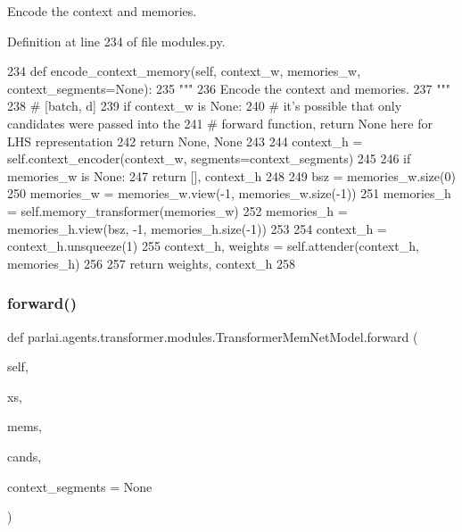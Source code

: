 \begin{DoxyVerb}Encode the context and memories.
\end{DoxyVerb}
 

Definition at line 234 of file modules.\+py.


\begin{DoxyCode}
234     \textcolor{keyword}{def }encode\_context\_memory(self, context\_w, memories\_w, context\_segments=None):
235         \textcolor{stringliteral}{"""}
236 \textcolor{stringliteral}{        Encode the context and memories.}
237 \textcolor{stringliteral}{        """}
238         \textcolor{comment}{# [batch, d]}
239         \textcolor{keywordflow}{if} context\_w \textcolor{keywordflow}{is} \textcolor{keywordtype}{None}:
240             \textcolor{comment}{# it's possible that only candidates were passed into the}
241             \textcolor{comment}{# forward function, return None here for LHS representation}
242             \textcolor{keywordflow}{return} \textcolor{keywordtype}{None}, \textcolor{keywordtype}{None}
243 
244         context\_h = self.context\_encoder(context\_w, segments=context\_segments)
245 
246         \textcolor{keywordflow}{if} memories\_w \textcolor{keywordflow}{is} \textcolor{keywordtype}{None}:
247             \textcolor{keywordflow}{return} [], context\_h
248 
249         bsz = memories\_w.size(0)
250         memories\_w = memories\_w.view(-1, memories\_w.size(-1))
251         memories\_h = self.memory\_transformer(memories\_w)
252         memories\_h = memories\_h.view(bsz, -1, memories\_h.size(-1))
253 
254         context\_h = context\_h.unsqueeze(1)
255         context\_h, weights = self.attender(context\_h, memories\_h)
256 
257         \textcolor{keywordflow}{return} weights, context\_h
258 
\end{DoxyCode}
\mbox{\label{classparlai_1_1agents_1_1transformer_1_1modules_1_1TransformerMemNetModel_a8c27f924c01b5017c7968b9d98969496}} 
\subsubsection{\texorpdfstring{forward()}{forward()}}
{\footnotesize\ttfamily def parlai.\+agents.\+transformer.\+modules.\+Transformer\+Mem\+Net\+Model.\+forward (\begin{DoxyParamCaption}\item[{}]{self,  }\item[{}]{xs,  }\item[{}]{mems,  }\item[{}]{cands,  }\item[{}]{context\+\_\+segments = {\ttfamily None} }\end{DoxyParamCaption})}

